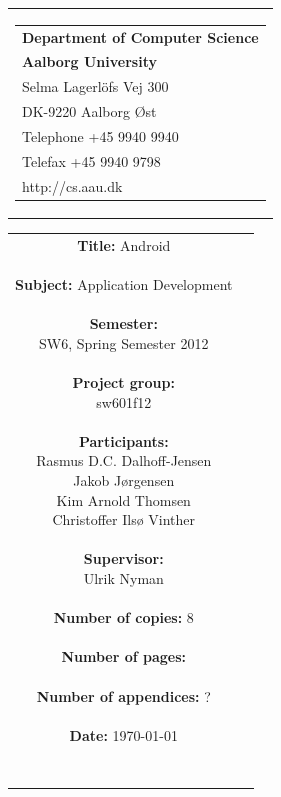 \begin{nopagebreak}
\samepage 
\begin{tabular}{r}
\parbox{\textwidth}{
\hfill \parbox{6.2cm}{\begin{tabular}{l}
{\textsf\small \textbf{Department of Computer Science }}\\
{\textsf\small  \textbf{Aalborg University}}\\
{\textsf\small Selma Lagerlöfs Vej 300}\\
{\textsf\small DK-9220 Aalborg Øst}\\
{\textsf\small Telephone +45 9940 9940}\\
{\textsf\small Telefax +45 9940 9798}\\
{\textsf\small http://cs.aau.dk}
\end{tabular}}}
\end{tabular}

\begin{tabular}{cc}
\parbox{7cm}{
\textbf{Title:} 
Android\\ \\
\textbf{Subject:} 
Application Development \\ \\
\textbf{Semester:} \\
SW6, Spring Semester 2012\\ \\
\textbf{Project group:} \\
sw601f12\\ \\
\textbf{Participants:} \\
Rasmus D.C. Dalhoff-Jensen \\
Jakob J\o{}rgensen \\
Kim Arnold Thomsen \\
Christoffer Ils\o{} Vinther\\ \\
\textbf{Supervisor:} \\
Ulrik Nyman\\ \\
\textbf{Number of copies:}
8 \\ \\
\textbf{Number of pages:}
 \\ \\
\textbf{Number of appendices:}
? \\ \\
\textbf{Date:}
\today \\ \\ \\
}


\end{tabular}
\end{nopagebreak}
